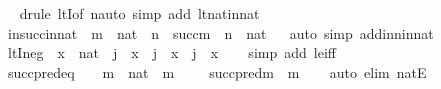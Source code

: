 \begin{isabellebody}
%
\isadelimproof
\ \ %
\endisadelimproof
%
\isatagproof
{}\isamarkupfalse%
{\isacharparenleft}{\kern0pt}drule\ ltI{\isacharbrackleft}{\kern0pt}of\ {\isachardoublequoteopen}n{\isachardoublequoteclose}{\isacharbrackright}{\kern0pt}{\isacharcomma}{\kern0pt}auto\ simp\ add{\isacharcolon}{\kern0pt}\ lt{\isacharunderscore}{\kern0pt}nat{\isacharunderscore}{\kern0pt}in{\isacharunderscore}{\kern0pt}nat{\isacharparenright}{\kern0pt}%
\endisatagproof
{\isafoldproof}%
%
\isadelimproof
\isanewline
%
\endisadelimproof
\isanewline
{}\isamarkupfalse%
\ in{\isacharunderscore}{\kern0pt}succ{\isacharunderscore}{\kern0pt}in{\isacharunderscore}{\kern0pt}nat\ {\isacharcolon}{\kern0pt}\ {\isachardoublequoteopen}m\ {\isasymin}\ nat\ {\isasymLongrightarrow}\ n\ {\isasymin}\ succ{\isacharparenleft}{\kern0pt}m{\isacharparenright}{\kern0pt}\ {\isasymLongrightarrow}\ n\ {\isasymin}\ nat{\isachardoublequoteclose}\isanewline
%
\isadelimproof
\ \ %
\endisadelimproof
%
\isatagproof
{}\isamarkupfalse%
{\isacharparenleft}{\kern0pt}auto\ simp\ add{\isacharcolon}{\kern0pt}in{\isacharunderscore}{\kern0pt}n{\isacharunderscore}{\kern0pt}in{\isacharunderscore}{\kern0pt}nat{\isacharparenright}{\kern0pt}%
\endisatagproof
{\isafoldproof}%
%
\isadelimproof
\isanewline
%
\endisadelimproof
\isanewline
{}\isamarkupfalse%
\ ltI{\isacharunderscore}{\kern0pt}neg\ {\isacharcolon}{\kern0pt}\ {\isachardoublequoteopen}x\ {\isasymin}\ nat\ {\isasymLongrightarrow}\ j\ {\isasymle}\ x\ {\isasymLongrightarrow}\ j\ {\isasymnoteq}\ x\ {\isasymLongrightarrow}\ j\ {\isacharless}{\kern0pt}\ x{\isachardoublequoteclose}\isanewline
%
\isadelimproof
\ \ %
\endisadelimproof
%
\isatagproof
{}\isamarkupfalse%
\ {\isacharparenleft}{\kern0pt}simp\ add{\isacharcolon}{\kern0pt}\ le{\isacharunderscore}{\kern0pt}iff{\isacharparenright}{\kern0pt}%
\endisatagproof
{\isafoldproof}%
%
\isadelimproof
\isanewline
%
\endisadelimproof
\isanewline
{}\isamarkupfalse%
\ succ{\isacharunderscore}{\kern0pt}pred{\isacharunderscore}{\kern0pt}eq\ \ {\isacharcolon}{\kern0pt}\ \ {\isachardoublequoteopen}m\ {\isasymin}\ nat\ {\isasymLongrightarrow}\ m\ {\isasymnoteq}\ {}\ \ {\isasymLongrightarrow}\ succ{\isacharparenleft}{\kern0pt}pred{\isacharparenleft}{\kern0pt}m{\isacharparenright}{\kern0pt}{\isacharparenright}{\kern0pt}\ {\isacharequal}{\kern0pt}\ m{\isachardoublequoteclose}\isanewline
%
\isadelimproof
\ \ %
\endisadelimproof
%
\isatagproof
{}\isamarkupfalse%
\ {\isacharparenleft}{\kern0pt}auto\ elim{\isacharcolon}{\kern0pt}\ natE{\isacharparenright}{\kern0pt}%

\end{isabellebody}
